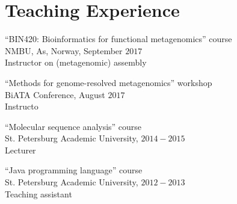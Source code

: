 \blankline

\section{Teaching Experience}
\vspace*{-.7cm}
\begin{outerlist}
\item
``BIN420: Bioinformatics for functional metagenomics'' course\\
NMBU, As, Norway, September $2017$\\
Instructor on (metagenomic) assembly
\item
``Methods for genome-resolved metagenomics'' workshop\\
BiATA Conference, August $2017$\\
Instructo\
\item
``Molecular sequence analysis'' course\\
St. Petersburg Academic University, $2014-2015$\\
Lecturer
\item
``Java programming language'' course\\
St. Petersburg Academic University, $2012-2013$\\
Teaching assistant
\end{outerlist}
